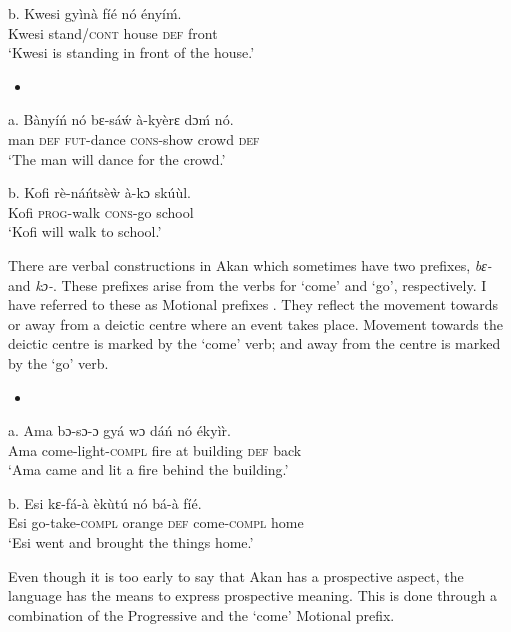 \documentclass[output=paper]{langsci/langscibook}
\begin{document}
\gll b.  Kwesi  gy\`{i}n\`{a}    f\'{i}\'{e}  n\'{o}  \'{e}ny\'{i}\'{m}.\\
       Kwesi  stand/\textsc{cont}  house  \textsc{def}  front\\
\glt ‘Kwesi is standing in front of the house.’
\z

\begin{itemize}
\item \end{itemize}
\gll a.  B\`{a}ny\'{i}\'{n}  n\'{o}  bɛ-s\'{a}\'{w}   \`{a}-ky\`{e}rɛ    dɔ\'{m}  n\'{o}.\\
       man  \textsc{def}  \textsc{fut}{}-dance  \textsc{cons}{}-show  crowd  \textsc{def}\\
\glt   ‘The man will dance for the crowd.’
\z

\gll   b.  Kofi  r\`{e}-n\'{a}\'{n}ts\`{e}\`{w}  \`{a}-kɔ    sk\'{u}\`{u}l.\\
       Kofi  \textsc{prog}{}-walk  \textsc{cons}{}-go  school\\
\glt   ‘Kofi will walk to school.’
\z

There are verbal constructions in Akan which sometimes have two prefixes, \emph{bɛ-} and \emph{kɔ-}. These prefixes arise from the verbs for ‘come’ and ‘go’, respectively. I have referred to these as Motional prefixes \citep{Osam2002}. They reflect the movement towards or away from a deictic centre where an event takes place. Movement towards the deictic centre is marked by the ‘come’ verb; and away from the centre is marked by the ‘go’ verb. 

\begin{itemize}
\item \end{itemize}
\gll a.  Ama  bɔ-sɔ-ɔ      gy\'{a}  wɔ  d\'{a}\'{n}    n\'{o}  \'{e}ky\`{i}\`{r}.\\
       Ama  come-light-\textsc{compl}  fire  at  building  \textsc{def}  back\\
\glt   ‘Ama came and lit a fire behind the building.’
\z

\gll  b.  Esi  kɛ-f\'{a}-\`{a}      \`{e}k\`{u}t\'{u}    n\'{o}  b\'{a}-\`{a}    f\'{i}\'{e}.\\
       Esi  go-take-\textsc{compl}  orange    \textsc{def}  come-\textsc{compl}  home\\
\glt   ‘Esi went and brought the things home.’
\z

Even though it is too early to say that Akan has a prospective aspect, the language has the means to express prospective meaning. This is done through a combination of the Progressive and the ‘come’ Motional prefix.
\end{document}
